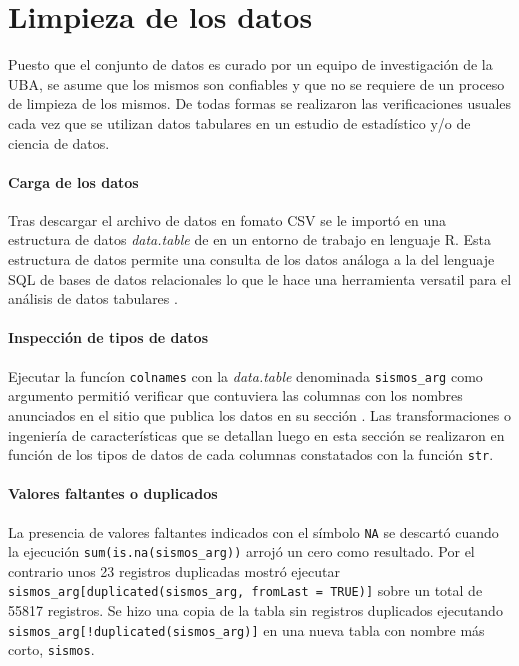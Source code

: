 \documentclass[a4paper]{report}
\begin{document}
\section{Limpieza de los datos}

Puesto que el conjunto de datos es curado por un equipo de investigación de la UBA, se asume que los mismos son confiables y que no se requiere de un proceso de limpieza de los mismos.
De todas formas se realizaron las verificaciones usuales cada vez que se utilizan datos tabulares en un estudio de estadístico y/o de ciencia de datos.

\paragraph{Carga de los datos}
Tras descargar el archivo de datos en fomato CSV se le importó en una estructura de datos \emph{data.table} de en un entorno de trabajo en lenguaje R.
Esta estructura de datos permite una consulta de los datos análoga a la del lenguaje SQL de bases de datos relacionales lo que le hace una herramienta versatil para el análisis de datos tabulares \cite{noauthor_introduction_2024}.

\paragraph{Inspección de tipos de datos}
Ejecutar la funcíon \verb'colnames' con la \emph{data.table} denominada \verb'sismos_arg' como argumento permitió verificar que contuviera las columnas con los nombres anunciados en el sitio que publica los datos en su sección \cite[Exploración inicial]{daniela_parada_ic-datasets-docencia_nodate}.
Las transformaciones o ingeniería de características que se detallan luego en esta sección se realizaron en función de los tipos de datos de cada columnas constatados con la función \verb'str'.


\paragraph{Valores faltantes o duplicados}
La presencia de valores faltantes indicados con el símbolo \verb'NA' se descartó cuando la ejecución \verb'sum(is.na(sismos_arg))' arrojó un cero como resultado.
Por el contrario unos \num{23} registros duplicadas mostró
ejecutar \verb'sismos_arg[duplicated(sismos_arg, fromLast = TRUE)]' sobre un total de \num{55817} registros.
Se hizo una copia de la tabla sin registros duplicados ejecutando \verb'sismos_arg[!duplicated(sismos_arg)]' en una nueva tabla con nombre más corto, \verb'sismos'.
\end{document}
